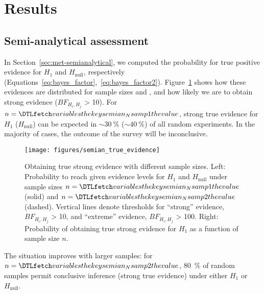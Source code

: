 \documentclass[twocolumn,twocolappendix,linenumbers]{aastex631}
\begin{document}
\section{Results}
\label{sec:results}


\subsection{Semi-analytical assessment}\label{sec:results-semianalytical}
In Section~\ref{sec:met-semianalytical}, we computed the probability for true positive evidence for $H_\mathrm{1}$ and $H_\mathrm{null}$, respectively (Equations~\ref{eq:bayes_factor},~\ref{eq:bayes_factor2}).
Figure~\ref{fig:semian_true_evidence} shows how these evidences are distributed for sample sizes  and , and how likely we are to obtain strong evidence ($BF_{H_i, H_j}$ > 10).
For $n = \var{semian_Nsamp1}$, strong true evidence for $H_\mathrm{1}$ ($H_\mathrm{null}$) can be expected in $\sim \SI{30}{\percent}$ ($\sim \SI{40}{\percent}$) of all random experiments.
In the majority of cases, the outcome of the survey will be inconclusive.
\begin{figure*}
    \begin{centering}
        \texttt{[image: figures/semian\_true\_evidence]}
        \caption{Obtaining true strong evidence with different sample sizes. Left: Probability to reach given evidence levels for $H_\mathrm{1}$ and $H_\mathrm{null}$ under sample sizes $n = \var{semian_Nsamp1}$ (solid) and $n = \var{semian_Nsamp2}$ (dashed). Vertical lines denote thresholds for ``strong'' evidence, $BF_{H_i, H_j}$ > 10, and ``extreme'' evidence, $BF_{H_i, H_j}$ > 100. Right: Probability of obtaining true strong evidence for $H_\mathrm{1}$ as a function of sample size $n$.}
        \label{fig:semian_true_evidence}
    \end{centering}
\end{figure*}
The situation improves with larger samples: for $n = \var{semian_Nsamp2}$, \SI{80}{\percent} of random samples permit conclusive inference (strong true evidence) under either $H_\mathrm{1}$ or $H_\mathrm{null}$.
\end{document}
